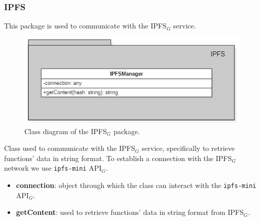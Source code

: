 	\subsubsection{IPFS}
	This package is used to communicate with the IPFS$_{G}$ service.
	\begin{figure} [h!]
		\centering
		\includegraphics[width=0.8\linewidth]{diagrammi/etherless-server/IPFS}
		\caption{Class diagram of the IPFS$_{G}$ package.}
	\end{figure}
	Class used to communicate with the IPFS$_{G}$ service, specifically to retrieve functions' data in string format. To establish a connection with the IPFS$_{G}$ network we use \texttt{ipfs-mini} API$_{G}$. 
	\begin{itemize}
		\item \textbf{connection}: object through which the class can interact with the \texttt{ipfs-mini} API$_{G}$.
	\end{itemize}
	\begin{itemize}
		\item \textbf{getContent}: used to retrieve functions' data in string format from IPFS$_{G}$.
	\end{itemize}
